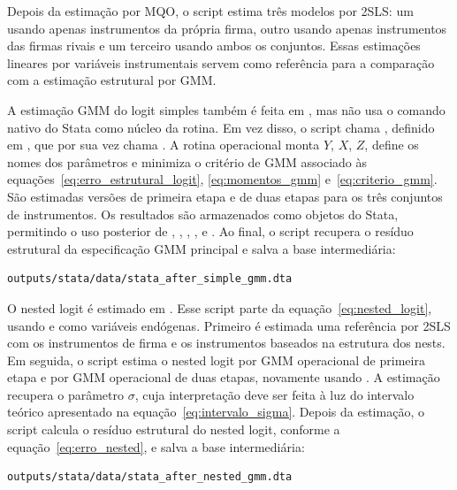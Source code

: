\documentclass[12pt,a4paper]{article}
\begin{document}
Depois da estimação por MQO, o script estima três modelos por 2SLS: um usando apenas instrumentos da própria firma, outro usando apenas instrumentos das firmas rivais e um terceiro usando ambos os conjuntos. Essas estimações lineares por variáveis instrumentais servem como referência para a comparação com a estimação estrutural por GMM.

A estimação GMM do logit simples também é feita em , mas não usa o comando nativo  do Stata como núcleo da rotina. Em vez disso, o script chama , definido em , que por sua vez chama . A rotina operacional monta $Y$, $X$, $Z$, define os nomes dos parâmetros e minimiza o critério de GMM associado às equações~\eqref{eq:erro_estrutural_logit}, \eqref{eq:momentos_gmm} e~\eqref{eq:criterio_gmm}. São estimadas versões de primeira etapa e de duas etapas para os três conjuntos de instrumentos. Os resultados são armazenados como objetos  do Stata, permitindo o uso posterior de , , , ,  e . Ao final, o script recupera o resíduo estrutural da especificação GMM principal e salva a base intermediária:

\begin{verbatim}
outputs/stata/data/stata_after_simple_gmm.dta
\end{verbatim}

O nested logit é estimado em . Esse script parte da equação~\eqref{eq:nested_logit}, usando  e  como variáveis endógenas. Primeiro é estimada uma referência por 2SLS com os instrumentos de firma e os instrumentos baseados na estrutura dos nests. Em seguida, o script estima o nested logit por GMM operacional de primeira etapa e por GMM operacional de duas etapas, novamente usando . A estimação recupera o parâmetro $\sigma$, cuja interpretação deve ser feita à luz do intervalo teórico apresentado na equação~\eqref{eq:intervalo_sigma}. Depois da estimação, o script calcula o resíduo estrutural do nested logit, conforme a equação~\eqref{eq:erro_nested}, e salva a base intermediária:

\begin{verbatim}
outputs/stata/data/stata_after_nested_gmm.dta
\end{verbatim}
\end{document}
